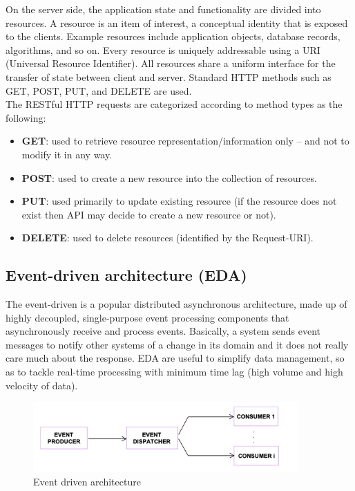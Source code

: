 \documentclass[a4paper, hidelinks, 12pt]{report}
\begin{document}
	On the server side, the application state and functionality are divided into resources. A resource is an item of interest, a conceptual identity that is exposed to the clients. Example resources include application objects, database records, algorithms, and so on. Every resource is uniquely addressable using a URI (Universal Resource Identifier). All resources share a uniform interface for the transfer of state between client and server. Standard HTTP methods such as GET, POST, PUT, and DELETE are used. \\
	
	The RESTful HTTP requests are categorized according to method types as the following:
	\begin{itemize}
	\item {\textbf{GET}}: used to retrieve resource representation/information only – and not to modify it in any way. 
	\item {\textbf{POST}}: used to create a new resource into the collection of resources.
	\item {\textbf{PUT}}: used primarily to update existing resource (if the resource does not exist then API may decide to create a new resource or not).
	\item {\textbf{DELETE}}: used to delete resources (identified by the Request-URI).
	\end{itemize}
	
	\subsection{Event-driven architecture (EDA)}
	The event-driven is a popular distributed asynchronous architecture, made up of highly decoupled, single-purpose event processing components that asynchronously receive and process events. Basically, a system sends event messages to notify other systems of a change in its domain and it does not really care much about the response. EDA are useful to simplify data management, so as to tackle real-time processing with minimum time lag (high volume and high velocity of data). 
	
	\begin{figure}[H]
    		\centering
		\includegraphics[width=0.9\textwidth]{diagrams/event_driven.png}
		\caption[Event driven architecture]{Event driven architecture}
		\label{fig:Event driven architecture}
	\end{figure}
\end{document}
